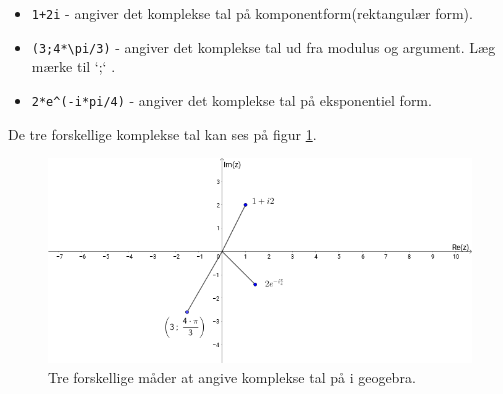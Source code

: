 \documentclass[a4paper, 12pt,titlepage]{article}
\begin{document}
\begin{itemize}
\item \texttt{1+2i} - angiver det komplekse tal på komponentform(rektangulær form).
\item \texttt{(3;4*\textbackslash{}pi/3)} - angiver det komplekse tal ud fra modulus og argument. Læg mærke til `;` .

\item \texttt{2*e\textasciicircum{}(-i*pi/4)} - angiver det komplekse tal på eksponentiel form.
\end{itemize}

De tre forskellige komplekse tal kan ses på figur \ref{ggb}.

\begin{figure}[htbp]
\centering
\includegraphics[width=.9\linewidth]{./img/komplekse_tal_ggb.png}
\caption{\label{ggb}Tre forskellige måder at angive komplekse tal på i geogebra.}
\end{figure}
\end{document}
